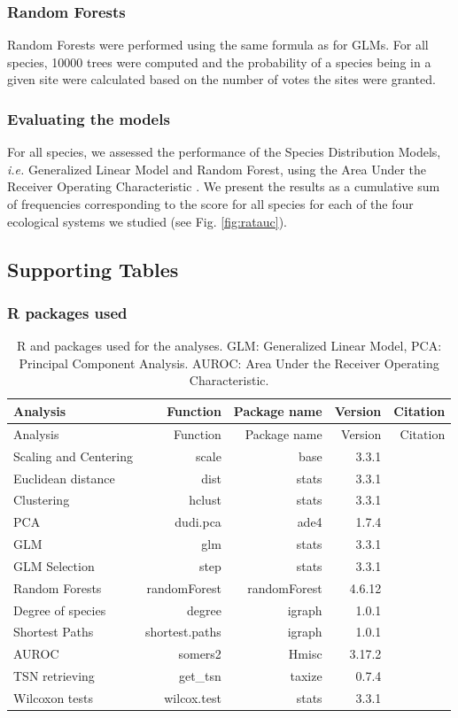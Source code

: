 \subsubsection{Random Forests}\label{random-forests}

Random Forests \citep{Prasad2006} were performed using the same formula
as for GLMs. For all species, 10000 trees were computed and the
probability of a species being in a given site were calculated based on
the number of votes the sites were granted.

\subsubsection{Evaluating the models}\label{evaluating-the-models}

For all species, we assessed the performance of the Species Distribution
Models, \emph{i.e.} Generalized Linear Model and Random Forest, using
the Area Under the Receiver Operating Characteristic
\citep[AUROC,][]{Elith2006}. We present the results as a cumulative sum
of frequencies corresponding to the score for all species for each of
the four ecological systems we studied (see Fig. \ref{fig:ratauc}).

\subsection{Supporting Tables}\label{supporting-tables}

\subsubsection{R packages used}\label{r-packages-used}

\begin{longtable}[]{@{}lrrrr@{}}
\caption{R and packages used for the analyses. GLM: Generalized Linear
Model, PCA: Principal Component Analysis. AUROC: Area Under the Receiver
Operating Characteristic. \label{tbl:rpkges}}\tabularnewline
\toprule
Analysis & Function & Package name & Version & Citation\tabularnewline
\midrule
\endfirsthead
\toprule
Analysis & Function & Package name & Version & Citation\tabularnewline
\midrule
\endhead
Scaling and Centering & scale & base & 3.3.1 &
\citet{Rcoreteam2015}\tabularnewline
Euclidean distance & dist & stats & 3.3.1 &
\citet{Rcoreteam2015}\tabularnewline
Clustering & hclust & stats & 3.3.1 &
\citet{Rcoreteam2015}\tabularnewline
PCA & dudi.pca & ade4 & 1.7.4 & \citet{Dray2007}\tabularnewline
GLM & glm & stats & 3.3.1 & \citet{Rcoreteam2015}\tabularnewline
GLM Selection & step & stats & 3.3.1 &
\citet{Rcoreteam2015}\tabularnewline
Random Forests & randomForest & randomForest & 4.6.12 &
\citet{Liaw2002}\tabularnewline
Degree of species & degree & igraph & 1.0.1 &
\citet{Csardi2006}\tabularnewline
Shortest Paths & shortest.paths & igraph & 1.0.1 &
\citet{Csardi2006}\tabularnewline
AUROC & somers2 & Hmisc & 3.17.2 & \citet{HarrellJr2016}\tabularnewline
TSN retrieving & get\_tsn & taxize & 0.7.4 &
\citet{Chamberlain2013}\tabularnewline
Wilcoxon tests & wilcox.test & stats & 3.3.1 &
\citet{Rcoreteam2015}\tabularnewline
\bottomrule
\end{longtable}

